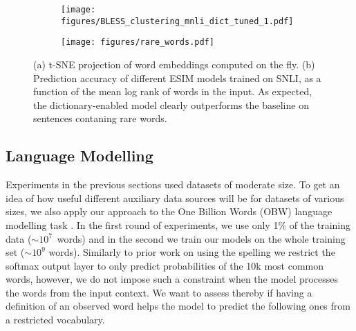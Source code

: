 \begin{figure}
  \begin{subfigure}[c]{0.5\textwidth}
    \texttt{[image: figures/BLESS\_clustering\_mnli\_dict\_tuned\_1.pdf]}
    \caption{\label{fig:SNLI_plot}}
  \end{subfigure}
  \begin{subfigure}[c]{0.5\textwidth}
    \texttt{[image: figures/rare\_words.pdf]}
    \caption{\label{fig:SNLI_rare_words}}
  \end{subfigure}
  \caption{
    (a) t-SNE projection of word embeddings computed on the fly. 
    (b) Prediction accuracy of different ESIM models trained on SNLI, as a function of the mean log rank of words in the input. As expected, the dictionary-enabled model clearly outperforms the baseline on sentences contaning rare words. 
  }
\end{figure}

\subsection{Language Modelling}
\label{sec:lm}
Experiments in the previous sections used datasets of moderate size. To get an idea of how useful different auxiliary data sources will be for datasets of various sizes, we also apply our approach to the One Billion Words (OBW) language modelling task \citep{chelba2014obw}. In the first round of experiments, we use only 1\% of the training data ($\sim 10^7$~words) and in the second we train our models on the whole training set ($\sim 10^9$ words). Similarly to prior work on using the spelling \citep{ling2015finding} we restrict the softmax output layer to only predict probabilities of the 10k most common words, however, we do not impose such a constraint when the model processes the words from the input context. 
We want to assess thereby if having a definition of an observed word helps the model to predict the following ones from a restricted vocabulary.




